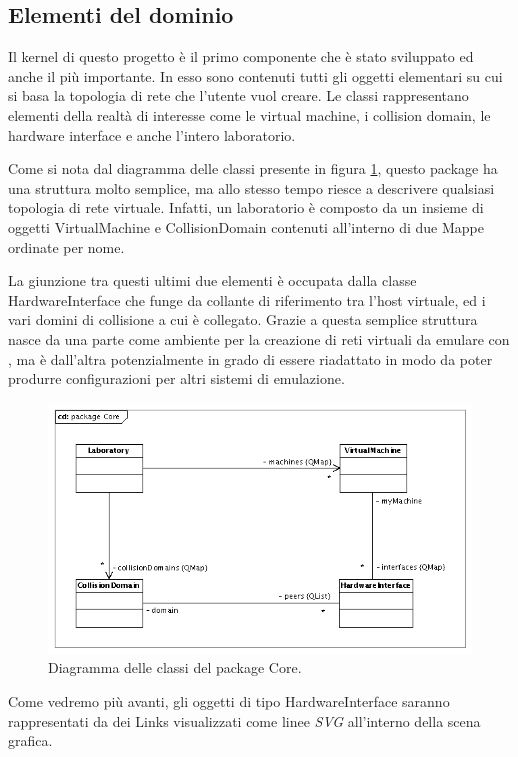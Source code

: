 \subsection{Elementi del dominio}
Il kernel di questo progetto è il primo componente che è stato sviluppato ed anche il più importante. In esso sono contenuti tutti gli oggetti elementari su cui si basa la topologia di rete che l'utente vuol creare. Le classi rappresentano elementi della realtà di interesse come le virtual machine, i collision domain, le hardware interface e anche l'intero laboratorio.

Come si nota dal diagramma delle classi presente in figura \ref{figura:uml_package_core}, questo package ha una struttura molto semplice, ma allo stesso tempo riesce a descrivere qualsiasi topologia di rete virtuale. Infatti, un laboratorio è composto da un insieme di oggetti VirtualMachine e CollisionDomain contenuti all'interno di due Mappe ordinate per nome.

La giunzione tra questi ultimi due elementi è occupata dalla classe HardwareInterface che funge da collante di riferimento tra l'host virtuale, ed i vari domini di collisione a cui è collegato.
Grazie a questa semplice struttura \visualnetkit{} nasce da una parte come ambiente per la creazione di reti virtuali da emulare con \netkit{}, ma è dall'altra potenzialmente in grado di essere riadattato in modo da poter produrre configurazioni per altri sistemi di emulazione.

\begin{figure}[!htb]
	\centering
	\includegraphics[width=12cm]{images/uml_package_core.png}
	\caption{Diagramma delle classi del package Core.}
	\label{figura:uml_package_core}
\end{figure}

Come vedremo più avanti, gli oggetti di tipo HardwareInterface saranno rappresentati da dei Links visualizzati come linee \emph{SVG} all'interno della scena grafica.

